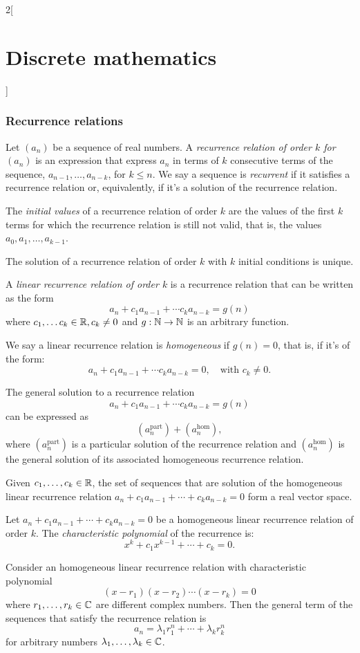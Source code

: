 \documentclass[../../../main.tex]{subfiles}
\begin{document}
\begin{multicols}{2}[\section{Discrete mathematics}]
\subsubsection*{Recurrence relations}
\begin{definition}
Let $(a_n)$ be a sequence of real numbers. A \textit{recurrence relation of order $k$ for $(a_n)$} is an expression that express $a_n$ in terms of $k$ consecutive terms of the sequence, $a_{n-1},\ldots,a_{n-k}$, for $k\leq n$. We say a sequence is \textit{recurrent} if it satisfies a recurrence relation or, equivalently, if it's a solution of the recurrence relation.
\end{definition}
\begin{definition}
The \textit{initial values} of a recurrence relation of order $k$ are the values of the first $k$ terms for which the recurrence relation is still not valid, that is, the values $a_0,a_1,\ldots,a_{k-1}$.
\end{definition}
\begin{lemma}
The solution of a recurrence relation of order $k$ with $k$ initial conditions is unique.
\end{lemma}
\begin{definition}
A \textit{linear recurrence relation of order $k$} is a recurrence relation that can be written as the form $$a_n+c_1a_{n-1}+\cdots c_ka_{n-k}=g(n)$$ where $c_1,\ldots c_k\in\mathbb{R} , c_k\ne 0$ and $g:\mathbb{N} \rightarrow\mathbb{N} $ is an arbitrary function.
\end{definition}
\begin{definition}
We say a linear recurrence relation is \textit{homogeneous} if $g(n)=0$, that is, if it's of the form: $$a_n+c_1a_{n-1}+\cdots c_ka_{n-k}=0,\quad\text{with }c_k\ne 0.$$
\end{definition}
\begin{prop}
The general solution to a recurrence relation $$a_n+c_1a_{n-1}+\cdots c_ka_{n-k}=g(n)$$ can be expressed as $$(a_n^\text{part})+(a_n^\text{hom}),$$ where $(a_n^\text{part})$ is a particular solution of the recurrence relation and $(a_n^\text{hom})$ is the general solution of its associated homogeneous recurrence relation.
\end{prop}
\begin{prop}
Given $c_1,\ldots,c_k\in\mathbb{R} $, the set of sequences that are solution of the homogeneous linear recurrence relation $a_n+c_1a_{n-1}+\cdots+c_ka_{n-k}=0$ form a real vector space.
\end{prop}
\begin{definition}
Let $a_n+c_1a_{n-1}+\cdots+c_ka_{n-k}=0$ be a homogeneous linear recurrence relation of order $k$. The \textit{characteristic polynomial} of the recurrence is: $$x^k+c_1x^{k-1}+\cdots+c_k=0.$$
\end{definition}
\begin{prop}
Consider an homogeneous linear recurrence relation with characteristic polynomial $$(x-r_1)(x-r_2)\cdots(x-r_k)=0$$ where $r_1,\ldots,r_k\in\mathbb{C} $ are different complex numbers. Then the general term of the sequences that satisfy the recurrence relation is $$a_n=\lambda_1r_1^n+\cdots+\lambda_kr_k^n$$ for arbitrary numbers $\lambda_1,\ldots,\lambda_k\in\mathbb{C} $.
\end{prop}

\end{multicols}
\end{document}
